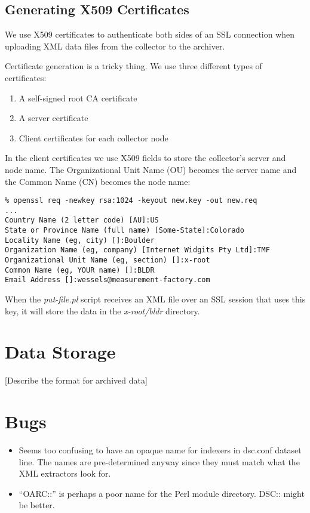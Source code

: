 \documentclass{report}
\begin{document}
\section{Generating X509 Certificates}

We use X509 certificates to authenticate both sides
of an SSL connection when uploading XML data files from 
the collector to the archiver.

Certificate generation is a tricky thing.  We use three different
types of certificates:
\begin{enumerate}
\item A self-signed root CA certificate
\item A server certificate
\item Client certificates for each collector node
\end{enumerate}

In the client certificates
we use X509 fields to store the collector's server and node name.
The Organizational Unit Name (OU) becomes the server name and
the Common Name (CN) becomes the node name:

\begin{verbatim}
% openssl req -newkey rsa:1024 -keyout new.key -out new.req
...
Country Name (2 letter code) [AU]:US
State or Province Name (full name) [Some-State]:Colorado
Locality Name (eg, city) []:Boulder
Organization Name (eg, company) [Internet Widgits Pty Ltd]:TMF
Organizational Unit Name (eg, section) []:x-root
Common Name (eg, YOUR name) []:BLDR
Email Address []:wessels@measurement-factory.com
\end{verbatim}

When the {\em put-file.pl\/} script receives an XML file over an SSL session
that uses this key, it will store the data in the {\em x-root/bldr\/} directory.

\chapter{Data Storage}

[Describe the format for archived data]

\chapter{Bugs}

\begin{itemize}

\item
	Seems too confusing to have an opaque name for indexers in dsc.conf dataset
	line.  The names are pre-determined anyway since they must match what the
	XML extractors look for.

\item
	``OARC::'' is perhaps a poor name for the Perl module directory.  DSC:: might
	be better.

\end{itemize}
\end{document}
